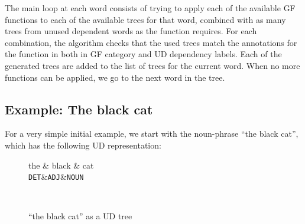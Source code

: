 The main loop at each word consists of trying to apply each of the available \ac{GF} functions to each of the available trees for that word, combined with as many trees from unused dependent words as the function requires. For each combination, the algorithm checks that the used trees match the annotations for the function in both in \ac{GF} category and \ac{UD} dependency labels. Each of the generated trees are added to the list of trees for the current word.
When no more functions can be applied, we go to the next word in the tree.

\subsection{Example: The black cat}

For a very simple initial example, we start with the noun-phrase ``the black cat'', which has the following \ac{UD} representation:

\begin{figure}[H]
    \centering
    \setlength{\unitlength}{0.2mm}
    \begin{dependency}
        \begin{deptext}[column sep=0.4cm]
              the \& black \& cat \\
            {\tt DET}\&{\tt ADJ}\&{\tt NOUN}\\
        \end{deptext}
    \end{dependency} \\
    \caption{``the black cat'' as a UD tree}
    \label{fig:the_black_cat_ud}
\end{figure}

